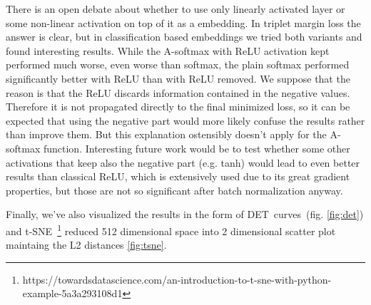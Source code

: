 \medskip
There is an open debate about whether to use only linearly activated layer or some non-linear activation on top of it as a embedding. In triplet margin loss the answer is clear, but in classification based embeddings we tried both variants and found interesting results. While the A-softmax with ReLU activation kept performed much worse, even worse than softmax, the plain softmax performed significantly better with ReLU than with ReLU removed. We suppose that the reason is that the ReLU discards information contained in the negative values. Therefore it is not propagated directly to the final minimized loss, so it can be expected that using the negative part would more likely confuse the results rather than improve them. But this explanation ostensibly doesn't apply for the A-softmax function. Interesting future work would be to test whether some other activations that keep also the negative part (e.g. tanh) would lead to even better results than classical ReLU, which is extensively used due to its great gradient properties, but those are not so significant after batch normalization anyway.

\medskip
Finally, we've also visualized the results in the form of DET~curves~(fig. \ref{fig:det}) and t-SNE~\footnote{https://towardsdatascience.com/an-introduction-to-t-sne-with-python-example-5a3a293108d1} reduced 512 dimensional space into 2 dimensional scatter plot maintaing the L2 distances \ref{fig:tsne}.

